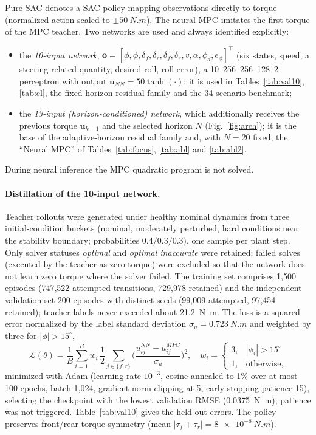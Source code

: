 \documentclass[preprint,12pt,authoryear=false]{elsarticle}
\theoremstyle{remark}\newtheorem{remark}{Remark}
\theoremstyle{plain}\newtheorem{proposition}{Proposition}\newtheorem{lemma}{Lemma}
\theoremstyle{definition}\newtheorem{assumption}{Assumption}
\begin{document}
Pure SAC denotes a SAC policy mapping observations directly to torque (normalized action scaled to $\pm\SI{50}{N.m}$). The neural MPC imitates the first torque of the MPC teacher. Two networks are used and always identified explicitly:
\begin{itemize}
\item the \emph{10-input network}, $\bm o=[\phi,\dot\phi,\delta_f,\delta_r,\dot\delta_f,\dot\delta_r,v,\alpha,\phi_d,e_\phi]^\top$ (six states, speed, a steering-related quantity, desired roll, roll error), a 10--256--256--128--2 perceptron with output $\bm u_{NN}=50\tanh(\cdot)$; it is used in Tables~\ref{tab:val10}, \ref{tab:cl}, the fixed-horizon residual family and the 34-scenario benchmark;
\item the \emph{13-input (horizon-conditioned) network}, which additionally receives the previous torque $\bm u_{k-1}$ and the selected horizon $N$ (Fig.~\ref{fig:arch}); it is the base of the adaptive-horizon residual family and, with $N=20$ fixed, the ``Neural MPC'' of Tables~\ref{tab:focus}, \ref{tab:abl} and \ref{tab:abl2}.
\end{itemize}
During neural inference the MPC quadratic program is not solved.

\paragraph{Distillation of the 10-input network.}
Teacher rollouts were generated under healthy nominal dynamics from three initial-condition buckets (nominal, moderately perturbed, hard conditions near the stability boundary; probabilities $0.4/0.3/0.3$), one sample per plant step. Only solver statuses \emph{optimal} and \emph{optimal inaccurate} were retained; failed solves (executed by the teacher as zero torque) were excluded so that the network does not learn zero torque where the solver failed. The training set comprises 1{,}500 episodes (747{,}522 attempted transitions, 729{,}978 retained) and the independent validation set 200 episodes with distinct seeds (99{,}009 attempted, 97{,}454 retained); teacher labels never exceeded about \SI{21.2}{N.m}. The loss is a squared error normalized by the label standard deviation $\sigma_u=\SI{0.723}{N.m}$ and weighted by three for $|\phi|>15^\circ$,
\begin{equation}
\mathcal L(\theta)=\frac1B\sum_{i=1}^B w_i\,\frac12\sum_{j\in\{f,r\}}\Big(\frac{u^{NN}_{ij}-u^{MPC}_{ij}}{\sigma_u}\Big)^2,\quad w_i=\begin{cases}3,&|\phi_i|>15^\circ\\1,&\text{otherwise,}\end{cases}\label{eq:loss}
\end{equation}
minimized with Adam (learning rate $10^{-3}$, cosine-annealed to 1\% over at most 100 epochs, batch 1{,}024, gradient-norm clipping at 5, early-stopping patience 15), selecting the checkpoint with the lowest validation RMSE (\SI{0.0375}{N.m}); patience was not triggered. Table~\ref{tab:val10} gives the held-out errors. The policy preserves front/rear torque symmetry (mean $|\tau_f+\tau_r|=\SI{8e-8}{N.m}$).
\end{document}
